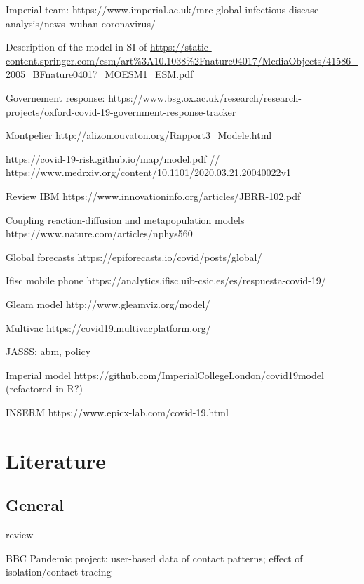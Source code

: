\documentclass[10pt]{article}
\begin{document}
	


Imperial team: https://www.imperial.ac.uk/mrc-global-infectious-disease-analysis/news--wuhan-coronavirus/

Description of the model in SI of \cite{ferguson2005strategies}
\url{https://static-content.springer.com/esm/art\%3A10.1038\%2Fnature04017/MediaObjects/41586_2005_BFnature04017_MOESM1_ESM.pdf}


Governement response: https://www.bsg.ox.ac.uk/research/research-projects/oxford-covid-19-government-response-tracker


Montpelier http://alizon.ouvaton.org/Rapport3{\_}Modele.html




https://covid-19-risk.github.io/map/model.pdf // 
https://www.medrxiv.org/content/10.1101/2020.03.21.20040022v1

Review IBM https://www.innovationinfo.org/articles/JBRR-102.pdf

Coupling reaction-diffusion and metapopulation models https://www.nature.com/articles/nphys560


Global forecasts https://epiforecasts.io/covid/posts/global/

Ifisc mobile phone https://analytics.ifisc.uib-csic.es/es/respuesta-covid-19/

Gleam model http://www.gleamviz.org/model/

Multivac https://covid19.multivacplatform.org/

\cite{adam2020special}

\cite{squazzoni2020} JASSS: abm, policy


Imperial model https://github.com/ImperialCollegeLondon/covid19model (refactored in R?)

INSERM https://www.epicx-lab.com/covid-19.html


\section{Literature}

\subsection{General}


\cite{Heesterbeekaaa4339} review

\cite{Klepac2020.02.16.20023754} \cite{gog2020you} BBC Pandemic project: user-based data of contact patterns; \cite{Kucharski2020.04.23.20077024} effect of isolation/contact tracing
\end{document}
